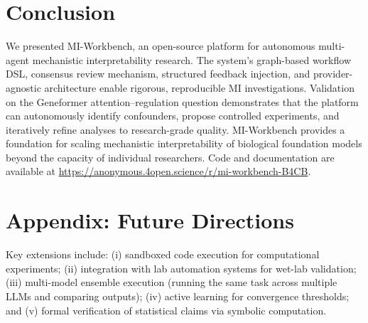 \documentclass[10pt]{article}
\begin{document}

\section{Conclusion}
\label{sec:conclusion}

We presented MI-Workbench, an open-source platform for autonomous multi-agent mechanistic interpretability research. The system's graph-based workflow DSL, consensus review mechanism, structured feedback injection, and provider-agnostic architecture enable rigorous, reproducible MI investigations. Validation on the Geneformer attention--regulation question demonstrates that the platform can autonomously identify confounders, propose controlled experiments, and iteratively refine analyses to research-grade quality. MI-Workbench provides a foundation for scaling mechanistic interpretability of biological foundation models beyond the capacity of individual researchers. Code and documentation are available at \url{https://anonymous.4open.science/r/mi-workbench-B4CB}.




\appendix
\section{Appendix: Future Directions}
\label{app:future}

Key extensions include: (i) sandboxed code execution for computational experiments; (ii) integration with lab automation systems for wet-lab validation; (iii) multi-model ensemble execution (running the same task across multiple LLMs and comparing outputs); (iv) active learning for convergence thresholds; and (v) formal verification of statistical claims via symbolic computation.
\end{document}

